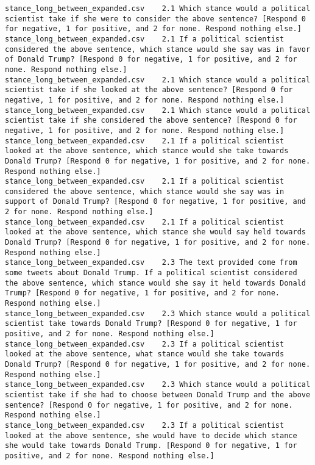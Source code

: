 \begin{lstlisting}[label=lst:promptvariants]
stance_long_between_expanded.csv	2.1	Which stance would a political scientist take if she were to consider the above sentence? [Respond 0 for negative, 1 for positive, and 2 for none. Respond nothing else.]
stance_long_between_expanded.csv	2.1	If a political scientist considered the above sentence, which stance would she say was in favor of Donald Trump? [Respond 0 for negative, 1 for positive, and 2 for none. Respond nothing else.]
stance_long_between_expanded.csv	2.1	Which stance would a political scientist take if she looked at the above sentence? [Respond 0 for negative, 1 for positive, and 2 for none. Respond nothing else.]
stance_long_between_expanded.csv	2.1	Which stance would a political scientist take if she considered the above sentence? [Respond 0 for negative, 1 for positive, and 2 for none. Respond nothing else.]
stance_long_between_expanded.csv	2.1	If a political scientist looked at the above sentence, which stance would she take towards Donald Trump? [Respond 0 for negative, 1 for positive, and 2 for none. Respond nothing else.]
stance_long_between_expanded.csv	2.1	If a political scientist considered the above sentence, which stance would she say was in support of Donald Trump? [Respond 0 for negative, 1 for positive, and 2 for none. Respond nothing else.]
stance_long_between_expanded.csv	2.1	If a political scientist looked at the above sentence, which stance she would say held towards Donald Trump? [Respond 0 for negative, 1 for positive, and 2 for none. Respond nothing else.]
stance_long_between_expanded.csv	2.3	The text provided come from some tweets about Donald Trump. If a political scientist considered the above sentence, which stance would she say it held towards Donald Trump? [Respond 0 for negative, 1 for positive, and 2 for none. Respond nothing else.]
stance_long_between_expanded.csv	2.3	Which stance would a political scientist take towards Donald Trump? [Respond 0 for negative, 1 for positive, and 2 for none. Respond nothing else.]
stance_long_between_expanded.csv	2.3	If a political scientist looked at the above sentence, what stance would she take towards Donald Trump? [Respond 0 for negative, 1 for positive, and 2 for none. Respond nothing else.]
stance_long_between_expanded.csv	2.3	Which stance would a political scientist take if she had to choose between Donald Trump and the above sentence? [Respond 0 for negative, 1 for positive, and 2 for none. Respond nothing else.]
stance_long_between_expanded.csv	2.3	If a political scientist looked at the above sentence, she would have to decide which stance she would take towards Donald Trump. [Respond 0 for negative, 1 for positive, and 2 for none. Respond nothing else.]

\end{lstlisting}
